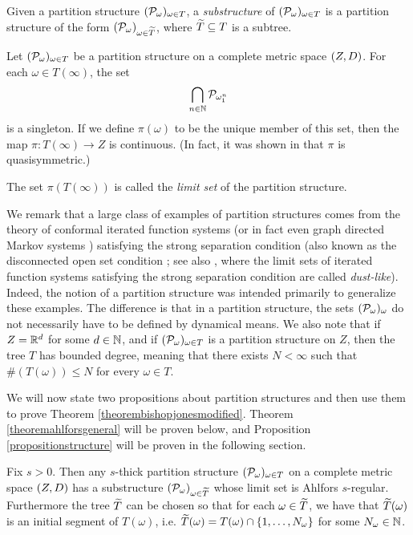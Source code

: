 \begin{definition}
\label{definitionpartitionsubstructure}
Given a partition structure $(\mathcal P_\omega)_{\omega\in T}$, a \emph{substructure} of $(\mathcal P_\omega)_{\omega\in T}$ is a partition structure of the form $(\mathcal P_\omega)_{\omega\in \widetilde T}$, where $\widetilde T\subseteq T$ is a subtree.
\end{definition}

\begin{observation}
Let $(\mathcal P_\omega)_{\omega\in T}$ be a partition structure on a
complete metric space $(Z,D)$. For each $\omega\in T(\infty)$, the set 
\[
\bigcap_{n\in\N}\PP_{\omega_1^n}
\]
is a singleton. If we define $\pi(\omega)$ to be the unique member of this set, then the map $\pi:T(\infty)\to Z$ is continuous. (In fact, it was shown in \cite[Lemma 5.11]{FSU4} that $\pi$ is quasisymmetric.)
\end{observation}

\begin{definition}
\label{definitionpartitionlimitset}
The set $\pi(T(\infty))$ is called the \emph{limit set} of the partition structure.
\end{definition}

We remark that a large class of examples of partition structures comes from the theory of conformal iterated function systems \cite{MauldinUrbanski1} (or in fact even graph directed Markov systems \cite{MauldinUrbanski2}) satisfying the strong separation condition (also known as the disconnected open set condition \cite{RiediMandelbrot}; see also \cite{FalconerMarsh}, where the limit sets of iterated function systems satisfying the strong separation condition are called \emph{dust-like}). Indeed, the notion of a partition structure was intended primarily to generalize these examples. The difference is that in a partition structure, the sets $(\mathcal P_\omega)_\omega$ do not necessarily have to be defined by dynamical means. We also note that if $Z = \R^d$ for some $d\in\N$, and if $(\mathcal P_\omega)_{\omega\in T}$ is a partition structure on $Z$, then the tree $T$ has bounded degree, meaning that there exists $N < \infty$ such that $\#(T(\omega))\leq N$ for every $\omega\in T$.

We will now state two propositions about partition structures and then use them to prove Theorem \ref{theorembishopjonesmodified}. Theorem \ref{theoremahlforsgeneral} will be proven below, and Proposition \ref{propositionstructure} will be proven in the following section.

\begin{theorem}
\label{theoremahlforsgeneral}
Fix $s > 0$. Then any $s$-thick partition structure $(\mathcal P_\omega)_{\omega\in T}$ on a complete metric space $(Z,D)$ has a substructure $(\mathcal P_\omega)_{\omega\in \widetilde T}$ whose limit set is Ahlfors $s$-regular. Furthermore the tree $\widetilde T$ can be chosen so that for each $\omega\in \widetilde T$, we have that $\widetilde T(\omega)$ is an initial segment of $T(\omega)$, i.e. $\widetilde T(\omega) = T(\omega)\cap\{1,\ldots,N_\omega\}$ for some $N_\omega\in\N$. 
\end{theorem}


